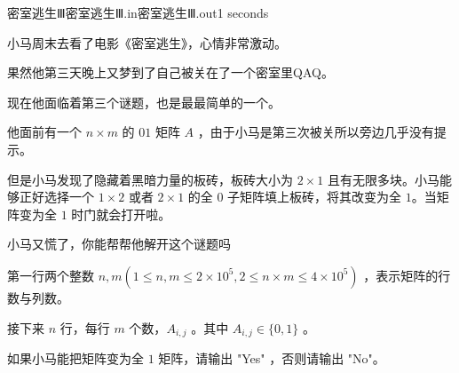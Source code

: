 \begin{problem}{密室逃生Ⅲ}{密室逃生Ⅲ.in}{密室逃生Ⅲ.out}{1 seconds}

小马周末去看了电影《密室逃生》，心情非常激动。

果然他第三天晚上又梦到了自己被关在了一个密室里QAQ。

现在他面临着第三个谜题，也是最最简单的一个。

他面前有一个 $n \times m$ 的 $01$ 矩阵 $A$ ，由于小马是第三次被关所以旁边几乎没有提示。

但是小马发现了隐藏着黑暗力量的板砖，板砖大小为 $2 \times 1$ 且有无限多块。小马能够正好选择一个 $1 \times 2$ 或者 $2 \times 1$ 的全 $0$ 子矩阵填上板砖，将其改变为全 $1$。当矩阵变为全 $1$ 时门就会打开啦。

小马又慌了，你能帮帮他解开这个谜题吗

\InputFile

第一行两个整数 $n,m(1 \leq n,m \leq 2 \times 10^5, 2 \leq n \times m \leq 4 \times 10^5)$ ，表示矩阵的行数与列数。

接下来 $n$ 行，每行 $m$ 个数，$A_{i,j}$ 。其中 $A_{i,j} \in \{0,1\}$ 。

\OutputFile

如果小马能把矩阵变为全 $1$ 矩阵，请输出 "Yes" ，否则请输出 "No"。

\Examples

\begin{example}
%
%
\end{example}
\end{problem}
